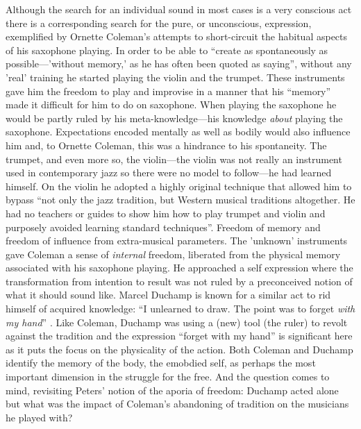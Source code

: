 \documentclass[a4paper]{article}
\begin{document}
Although the search for an individual sound in most cases is a very conscious act there is a corresponding search for the pure, or unconscious, expression, exemplified by Ornette Coleman's attempts to short-circuit the habitual aspects of his saxophone playing. In order to be able to ``create as spontaneously as possible---'without memory,' as he has often been quoted as saying''\citet[p. 117]{litzweiler92}, without any 'real' training he started playing the violin and the trumpet. These instruments gave him the freedom to play and improvise in a manner that his ``memory'' made it difficult for him to do on saxophone. When playing the saxophone he would be partly ruled by his meta-knowledge---his knowledge \emph{about} playing the saxophone. Expectations encoded mentally as well as bodily would also influence him and, to Ornette Coleman, this was a hindrance to his spontaneity. The trumpet, and even more so, the violin---the violin was not really an instrument used in contemporary jazz so there were no model to follow---he had learned himself. On the violin he adopted a highly original technique that allowed him to bypass ``not only the jazz tradition, but Western musical traditions altogether. He had no teachers or guides to show him how to play trumpet and violin and purposely avoided learning standard techniques''.\citet[p. 117]{litzweiler92} Freedom of memory and freedom of influence from extra-musical parameters. The 'unknown' instruments gave Coleman a sense of \emph{internal} freedom, liberated from the physical memory associated with his saxophone playing. He approached a self expression where the transformation from intention to result was not ruled by a preconceived notion of what it should sound like. Marcel Duchamp is known for a similar act to rid himself of acquired knowledge: ``I unlearned to draw. The  point was to forget \emph{with my hand}'' \citep[Duchamp, as quoted in][s.29]{tomkins65}. Like Coleman, Duchamp was using a (new) tool (the ruler) to revolt against the tradition and the expression ``forget with my hand'' is significant here as it puts the focus on the physicality of the action. Both Coleman and Duchamp identify the memory of the body, the emobdied self, as perhaps the most important dimension in the struggle for the free. And the question comes to mind, revisiting Peters' notion of the aporia of freedom: Duchamp acted alone but what was the impact of Coleman's abandoning of tradition on the musicians he played with?
\end{document}
